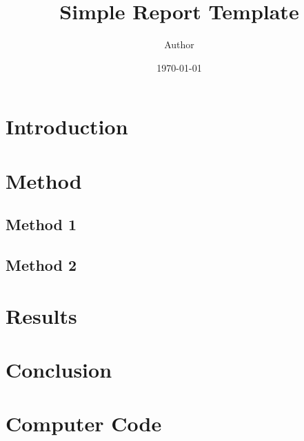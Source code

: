 \documentclass{article}
\title{Simple Report Template}
\author{Author}
\date{\today}
\begin{document}
\maketitle

\section{Introduction}


\section{Method}


\subsection{Method 1}



\subsection{Method 2}


\section{Results}



\section{Conclusion}



\newpage

\appendix

\section{Computer Code}
\end{document}
